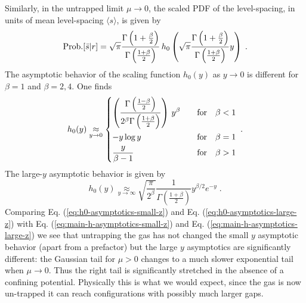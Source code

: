 \documentclass[onecolumn,superscriptaddress,
 amsmath,amssymb,
 aps,
 prd,
]{revtex4-1}
\begin{document}
\vspace*{0.3cm}
Similarly, in the untrapped limit $\mu \to 0$, the scaled PDF of the level-spacing, in units of mean level-spacing $\langle s \rangle$, is given by
\begin{equation} \label{eq:mean-gap-mu0}
{\rm Prob.}[\bar{s} \vert r] = \sqrt{\pi} \frac{\Gamma\left(1 + \frac{\beta}{2}\right)}{\Gamma\left( \frac{1 + \beta}{2} \right)} \, h_0\left( \sqrt{\pi} \frac{\Gamma\left(1 + \frac{\beta}{2}\right)}{\Gamma\left( \frac{1 + \beta}{2} \right)} y \right) \;.
\end{equation}
The asymptotic behavior of the scaling function $h_0(y)$ as $y \to 0$ is different for $\beta = 1$ and $\beta = 2,4$. One finds 
%
\begin{equation} \label{eq:h0-asymptotics-small-z}
h_0(y)  \underset{y \to 0}{\approx} \begin{dcases}
\left( \frac{\Gamma\left(\frac{1 - \beta}{2}\right)}{2^\beta \Gamma\left( \frac{1 + \beta}{2} \right)} \right)\,y^\beta \quad &{\rm for} \quad \beta < 1\\
- y \log y & {\rm for}\quad \beta = 1 \\
\frac{y}{\beta - 1} &{\rm for} \quad \beta >1 
\end{dcases} \;.
\end{equation}
The large-$y$ asymptotic behavior is given by
\begin{equation} \label{eq:h0-asymptotics-large-z}
h_0(y) \underset{y \to \infty}{\approx}  \sqrt{\frac{\pi}{2^\beta}} \frac{1}{\Gamma\left( \frac{1 + \beta}{2} \right)} y^{\beta/2} e^{-y} \;.
\end{equation}
Comparing Eq. (\ref{eq:h0-asymptotics-small-z}) and Eq. (\ref{eq:h0-asymptotics-large-z}) with Eq. (\ref{eq:main-h-asymptotics-small-z}) and Eq. (\ref{eq:main-h-asymptotics-large-z}) we see that untrapping the gas has not changed the small $y$ asymptotic behavior (apart from a prefactor) but the large $y$ asymptotics are significantly different: the Gaussian tail for $\mu > 0$ changes to a much slower exponential tail when $\mu \to 0$. Thus the right tail is significantly stretched in the absence of a confining potential. Physically this is what we would expect, since the gas is now un-trapped it can reach configurations with possibly much larger gaps.
\end{document}
